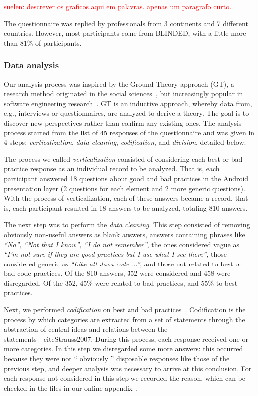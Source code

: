 \textcolor{red}{suelen: descrever os graficos aqui em palavras. apenas um paragrafo curto.}

The questionnaire was replied by professionals from 3 continents and 7 different countries.
However, most participants come from BLINDED, with a little more than 81\% of participants.

\subsubsection{Data analysis}
\label{etapa-1-analise}

Our analysis process was inspired by the Ground Theory approach (GT), a research method originated in the social sciences~\cite{Strauss2007, GlaserStrauss1999}, but increasingly popular in software engineering research~\cite{Adolph2011}. 
GT is an inductive approach, whereby data from, e.g., interviews or questionnaires, are analyzed to derive a theory. The goal is to discover new perspectives rather than confirm any existing ones. The analysis process started from the list of 45 responses of the questionnaire and was given in 4 steps: \textit{verticalization}, \textit {data cleaning}, \textit {codification}, and \textit {division}, detailed below.

The process we called \textit{verticalization} consisted of considering each best or bad practice response as an individual record to be analyzed. That is, each participant answered 18 questions about good and bad practices in the Android presentation layer (2 questions for each element and 2 more generic questions). With the process of verticalization, each of these answers became a record, that is, each participant resulted in 18 answers to be analyzed, totaling 810 answers.

The next step was to perform the \textit{data cleaning}. This step consisted of removing obviously non-useful answers as blank answers, answers containing phrases like \textit{``No'', ``Not that I know'', ``I do not remember''}, the ones considered vague as \textit{``I'm not sure if they are good practices but I use what I see there''}, those considered generic as \textit{``Like all Java code ...''}, and those not related to best or bad code practices. Of the 810 answers, 352 were considered and 458 were disregarded. Of the 352, 45\% were related to bad practices, and 55\% to best practices.

Next, we performed \textit{codification} on best and bad practices~\cite{Strauss2007, Saldana2013}. Codification is the process by which categories are extracted from a set of statements through the abstraction of central ideas and relations between the statements~\ cite{Strauss2007}. During this process, each response received one or more categories. In this step we disregarded some more answers: this occurred because they were not `` obviously '' disposable responses like those of the previous step, and deeper analysis was necessary to arrive at this conclusion. For each response not considered in this step we recorded the reason, which can be checked in the files in our online appendix~\cite{apendice}.

